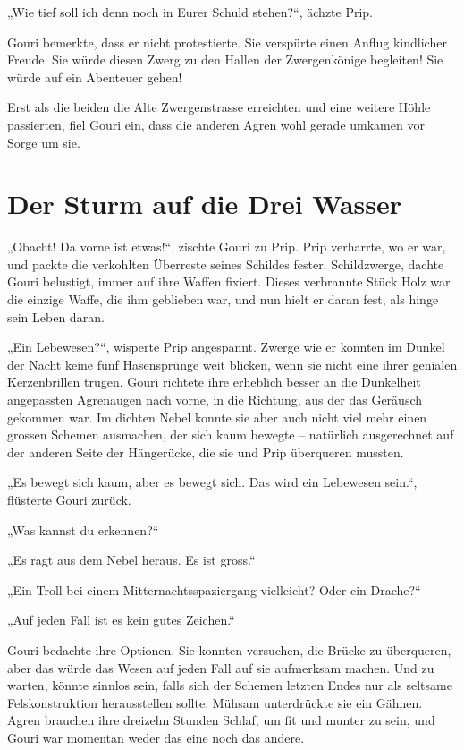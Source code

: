 „Wie tief soll ich denn noch in Eurer Schuld stehen?“, ächzte Prip.

Gouri bemerkte, dass er nicht protestierte. Sie verspürte einen Anflug kindlicher Freude. Sie würde diesen Zwerg zu den Hallen der Zwergenkönige begleiten! Sie würde auf ein Abenteuer gehen!

Erst als die beiden die Alte Zwergenstrasse erreichten und eine weitere Höhle passierten, fiel Gouri ein, dass die anderen Agren wohl gerade umkamen vor Sorge um sie.






\newpage
\section{Der Sturm auf die Drei Wasser}

„Obacht! Da vorne ist etwas!“, zischte Gouri zu Prip. Prip verharrte, wo er war, und packte die verkohlten Überreste seines Schildes fester. Schildzwerge, dachte Gouri belustigt, immer auf ihre Waffen fixiert. Dieses verbrannte Stück Holz war die einzige Waffe, die ihm geblieben war, und nun hielt er daran fest, als hinge sein Leben daran.

„Ein Lebewesen?“, wisperte Prip angespannt. Zwerge wie er konnten im Dunkel der Nacht keine fünf Hasensprünge weit blicken, wenn sie nicht eine ihrer genialen Kerzenbrillen trugen. Gouri richtete ihre erheblich besser an die Dunkelheit angepassten Agrenaugen nach vorne, in die Richtung, aus der das Geräusch gekommen war. Im dichten Nebel konnte sie aber auch nicht viel mehr einen grossen Schemen ausmachen, der sich kaum bewegte – natürlich ausgerechnet auf der anderen Seite der Hängerücke, die sie und Prip überqueren mussten.

„Es bewegt sich kaum, aber es bewegt sich. Das wird ein Lebewesen sein.“, flüsterte Gouri zurück.

„Was kannst du erkennen?“

„Es ragt aus dem Nebel heraus. Es ist gross.“

„Ein Troll bei einem Mitternachtsspaziergang vielleicht? Oder ein Drache?“

„Auf jeden Fall ist es kein gutes Zeichen.“

Gouri bedachte ihre Optionen. Sie konnten versuchen, die Brücke zu überqueren, aber das würde das Wesen auf jeden Fall auf sie aufmerksam machen. Und zu warten, könnte sinnlos sein, falls sich der Schemen letzten Endes nur als seltsame Felskonstruktion herausstellen sollte. Mühsam unterdrückte sie ein Gähnen. Agren brauchen ihre dreizehn Stunden Schlaf, um fit und munter zu sein, und Gouri war momentan weder das eine noch das andere.

